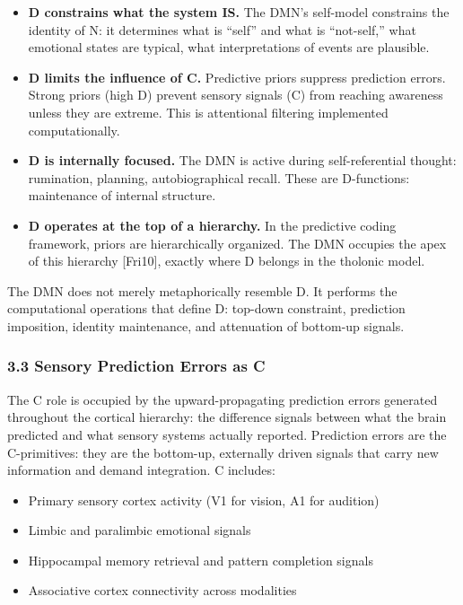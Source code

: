 \documentclass[
  11pt,
  letterpaper,
]{article}
\providecommand{\tightlist}{%
  \setlength{\itemsep}{0pt}\setlength{\parskip}{0pt}}
\begin{document}
\begin{itemize}
\tightlist
\item
  \textbf{D constrains what the system IS.} The DMN's self-model
  constrains the identity of N: it determines what is ``self'' and what
  is ``not-self,'' what emotional states are typical, what
  interpretations of events are plausible.
\item
  \textbf{D limits the influence of C.} Predictive priors suppress
  prediction errors. Strong priors (high D) prevent sensory signals (C)
  from reaching awareness unless they are extreme. This is attentional
  filtering implemented computationally.
\item
  \textbf{D is internally focused.} The DMN is active during
  self-referential thought: rumination, planning, autobiographical
  recall. These are D-functions: maintenance of internal structure.
\item
  \textbf{D operates at the top of a hierarchy.} In the predictive
  coding framework, priors are hierarchically organized. The DMN
  occupies the apex of this hierarchy {[}Fri10{]}, exactly where D
  belongs in the tholonic model.
\end{itemize}

The DMN does not merely metaphorically resemble D. It performs the
computational operations that define D: top-down constraint, prediction
imposition, identity maintenance, and attenuation of bottom-up signals.

\subsubsection{3.3 Sensory Prediction Errors as
C}\label{sensory-prediction-errors-as-c}

The C role is occupied by the upward-propagating prediction errors
generated throughout the cortical hierarchy: the difference signals
between what the brain predicted and what sensory systems actually
reported. Prediction errors are the C-primitives: they are the
bottom-up, externally driven signals that carry new information and
demand integration. C includes:

\begin{itemize}
\tightlist
\item
  Primary sensory cortex activity (V1 for vision, A1 for audition)
\item
  Limbic and paralimbic emotional signals
\item
  Hippocampal memory retrieval and pattern completion signals
\item
  Associative cortex connectivity across modalities
\end{itemize}
\end{document}
